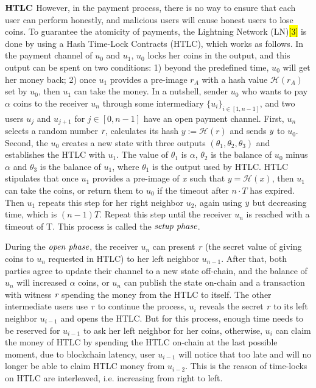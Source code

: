 \documentclass[conference]{IEEEtran}
\begin{document}
\noindent $\bf{HTLC}$   However, in the payment process, there is no way to ensure that each user can perform honestly, and malicious users will 
cause honest users to lose coins. To guarantee the atomicity of payments, the Lightning Network (LN)\colorbox{yellow}{[3]} is done by 
using a Hash Time-Lock Contracts (HTLC), which works as follows. In the payment channel of $u_0$ and $u_1$, $u_0$ locks her coins in 
the output, and this output can be spent on two conditions: 1) beyond the predefined time, $u_0$ will get her money back; 2) once $u_1$ 
provides a pre-image $r_A$ with a hash value $\mathcal H(r_A)$ set by $u_0$, then $u_1$ can take the money. In a nutshell, sender $u_0$ 
who wants to pay $\alpha$ coins to the receiver $u_n$ through some intermediary ${\{u_i\}}_{i\in[1,n-1]}$, and two users $u_j$ and $u_{j+1}$ for 
$j \in [0,n-1]$ have an open payment channel. First, $u_n$ selects a random number $\emph{r}$, calculates its hash $y:= \mathcal H(r)$ 
and sends $\emph{y}$ to $u_0$. Second, the $u_0$ creates a new state with three outputs $(\theta_1, \theta_2, \theta_3)$ and establishes 
the HTLC with $u_1$. The value of $\theta_1$ is $\alpha$, $\theta_2$ is the balance of $u_0$ minus $\alpha$ and $\theta_3$ is the balance of $u_1$,
where $\theta_1$ is the output used by HTLC. HTLC stipulates that once $u_1$ provides a pre-image of $\emph{x}$ such that $y = \mathcal H(x)$, 
then $u_1$ can take the coins, or return them to $u_0$ if the timeout after $n\cdot T$ has expired. Then $u_1$ repeats this step for her right 
neighbor $u_2$, again using $\emph{y}$ but decreasing time, which is $(n-1)T$. Repeat this step until the receiver $u_n$ is reached with a 
timeout of T. This process is called the $\emph{setup phase}$. 

During the $\emph{open phase}$, the receiver $u_n$ can present $\emph{r}$ 
(the secret value of giving coins to $u_n$ requested in HTLC) to her left neighbor $u_{n-1}$. After that, both parties agree to update their 
channel to a new state off-chain, and the balance of $u_n$ will increased $\alpha$ coins, or $u_n$ can publish the state on-chain and a transaction 
with witness $\emph{r}$ spending the money from the HTLC to itself. The other intermediate users use $\emph{r}$ to continue the process, 
 $u_i$ reveals the secret $\emph{r}$ to its left neighbor $u_{i-1}$ and opens the HTLC. But for this process, enough time needs to be 
 reserved for $u_{i-1}$ to ask her left neighbor for her coins, otherwise, $u_i$ can claim the money of HTLC by spending the HTLC on-chain 
 at the last possible moment, due to blockchain latency, user $u_{i-1}$ will notice that too late and will no longer be able to claim HTLC 
 money from $u_{i-2}$. This is the reason of time-locks on HTLC are interleaved, i.e. increasing from right to left.
\end{document}
